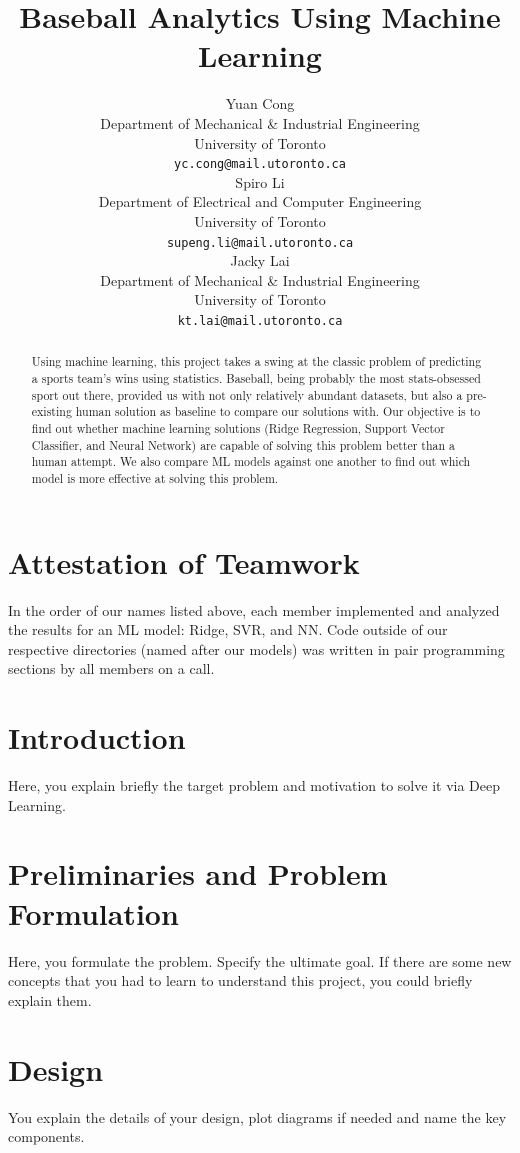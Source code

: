\documentclass{article}
\title{Baseball Analytics Using Machine Learning}
\author{%
  Yuan Cong\\
  Department of Mechanical \& Industrial Engineering\\
  University of Toronto\\
  \texttt{yc.cong@mail.utoronto.ca} \\
  \And
  Spiro Li\\
  Department of Electrical and Computer Engineering\\
  University of Toronto\\
  \texttt{supeng.li@mail.utoronto.ca} \\
  \And
  Jacky Lai\\
  Department of Mechanical \& Industrial Engineering\\
  University of Toronto\\
  \texttt{kt.lai@mail.utoronto.ca} \\
}
\begin{document}
\maketitle


\begin{abstract}
Using machine learning, this project takes a swing at the classic problem of predicting a sports team's wins using statistics. Baseball, being probably the most stats-obsessed sport out there, provided us with not only relatively abundant datasets, but also a pre-existing human solution as baseline to compare our solutions with. Our objective is to find out whether machine learning solutions (Ridge Regression, Support Vector Classifier, and Neural Network) are capable of solving this problem better than a human attempt. We also compare ML models against one another to find out which model is more effective at solving this problem.
\end{abstract}

\section*{Attestation of Teamwork}
In the order of our names listed above, each member implemented and analyzed the results for an ML model: Ridge, SVR, and NN. Code outside of our respective directories (named after our models) was written in pair programming sections by all members on a call.



\section{Introduction}
Here, you explain briefly the target problem and motivation to solve it via Deep Learning.

\section{Preliminaries and Problem Formulation}
Here, you formulate the problem. Specify the ultimate goal. If there are some new concepts that you had to learn to understand this project, you could briefly explain them. 
	
\section{Design}
You explain the details of your design, plot diagrams if needed and name the key components. 
\end{document}
